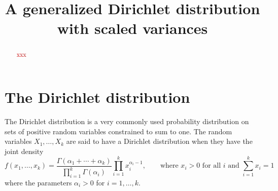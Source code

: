 \documentclass[ba]{imsart}
\numberwithin{equation}{section}
\theoremstyle{plain}
\newcommand{\falta}[1]{\textcolor{red}{#1}}
\begin{document}
\begin{frontmatter}
\title{A generalized Dirichlet distribution with scaled variances}






\begin{abstract}
\falta{xxx}
\end{abstract}

\begin{keyword}[class=MSC]
\kwd[Primary ]{\falta{60K35}}
\kwd{\falta{60K35}}
\kwd[; secondary ]{\falta{60K35}}
\end{keyword}

\begin{keyword}
\kwd{\falta{xxx}}
\kwd{\falta{xxx}}
\end{keyword}

\end{frontmatter}

\section{The Dirichlet distribution}

The Dirichlet distribution is a very commonly used probability
distribution on sets of positive random variables constrained to sum
to one.  The random variables $X_1,\ldots,X_k$ are said to have a
Dirichlet distribution when they have the joint density
$$
f(x_1,\ldots,x_k) = \frac{\Gamma(\alpha_1 + \cdots +
  \alpha_k)}{\prod_{i=1}^k \Gamma(\alpha_i)} \prod_{i=1}^k
x_i^{\alpha_i - 1}, \qquad \text{where $x_i > 0$ for all $i$ and
  $\sum_{i=1}^k x_i = 1$}
$$
where the parameters $\alpha_i > 0$ for $i=1,\ldots,k$.
\end{document}
